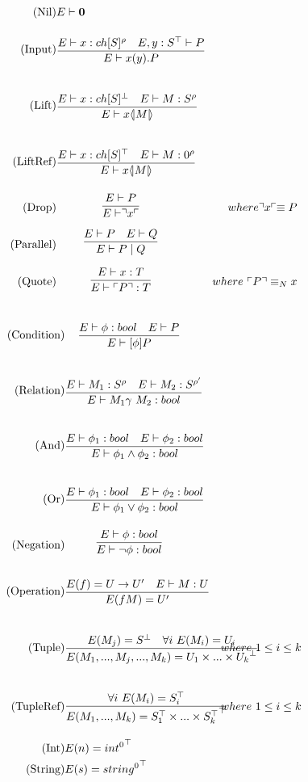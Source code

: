 \begin{align*}
\tag{Nil} &E \vdash \nil\\
\tag{Input} &\infrule{E\vdash x:ch[S]^\rho\quad E,y:S^\top\vdash P}{E \vdash \inp{x}{y}P}\\
\tag{Lift} &\infrule{E\vdash x:ch[S]^\bot\quad E \vdash M:S^\rho}{E\vdash \lift{x}{M}}\\
\tag{LiftRef} &\infrule{E\vdash x:ch[S]^\top\quad E \vdash M:0^\rho}{E\vdash \lift{x}{M}}\\
\tag{Drop} &\infrule{E \vdash P}{E\vdash \drop{x}}& where \drop{x} \equiv P\\
\tag{Parallel} &\infrule{E\vdash P \quad E \vdash Q}{E \vdash P \para Q}\\
\tag{Quote} &\infrule{E \vdash x:T}{E\vdash \quot{P}:T}& where\ \quot{P} \equiv_N x
\end{align*}

\begin{align*}
\tag{Condition} &\infrule{E\vdash \phi:bool\quad E\vdash P}{E \vdash [\phi] P}\\
\tag{Relation} &\infrule{E\vdash M_1:S^\rho \quad E\vdash M_2:S^{\rho'}}{E\vdash M_1 \gamma\ M_2:bool}\\
\tag{And} &\infrule{E\vdash \phi _1:bool \quad E\vdash \phi _2:bool}{E\vdash \phi _1 \land \phi _2:bool}\\
\tag{Or} &\infrule{E\vdash \phi _1:bool \quad E\vdash \phi _2:bool}{E\vdash \phi _1 \lor \phi _2:bool}\\
\tag{Negation} &\infrule{E\vdash \phi :bool }{E\vdash \neg \phi :bool}\\
\tag{Operation} &\infrule{E(f)=U\ra U'\quad E\vdash M:U}{E(fM)=U'}\\
\tag{Tuple} &\infrule{E(M_j)=S^\bot\quad\forall i\ E(M_i) = U_i}{E(M_1,...,M_j,...,M_k)={U_1\times...\times U_k}^\bot}& where\ 1\leq i\leq k\\
\tag{TupleRef} &\infrule{\forall i\ E(M_i) = S_i^\top}{E(M_1,...,M_k)={S_1^\top\times...\times S_k^\top}^\top}& where\ 1\leq i\leq k\\
\tag{Int} &E(n)={int^0}^\top\\
\tag{String} &E(s)={string^0}^\top\\
\end{align*}


